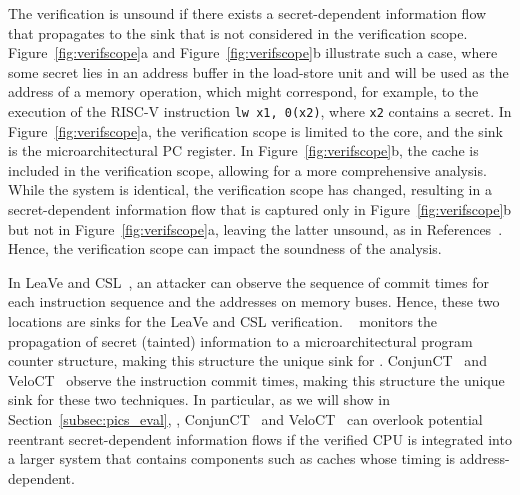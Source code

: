 The verification is unsound if there exists a secret-dependent information flow that propagates to the sink that is not considered in the verification scope.
Figure~\ref{fig:verifscope}a and Figure~\ref{fig:verifscope}b illustrate such a case, where some secret lies in an address buffer in the load-store unit and will be used as the address of a memory operation, which might correspond, for example, to the execution of the RISC-V instruction \texttt{lw x1, 0(x2)}, where \texttt{x2} contains a secret.
In Figure~\ref{fig:verifscope}a, the verification scope is limited to the core, and the sink is the microarchitectural PC register.
In Figure~\ref{fig:verifscope}b, the cache is included in the verification scope, allowing for a more comprehensive analysis.
While the system is identical, the verification scope has changed, resulting in a secret-dependent information flow that is captured only in Figure~\ref{fig:verifscope}b but not in Figure~\ref{fig:verifscope}a, leaving the latter unsound, as in References~\cite{ceesay2024mucfi,dinesh2024conjunct,dinesh2025h,tan2025contractshadowlogic}.
Hence, the verification scope can impact the soundness of the analysis.


In LeaVe and CSL~\cite{tan2025contractshadowlogic}, an attacker can observe the sequence of commit times for each instruction sequence and the addresses on memory buses.
Hence, these two locations are sinks for the LeaVe and CSL verification.
\ucfi~\cite{ceesay2024mucfi} monitors the propagation of secret (tainted) information to a microarchitectural program counter structure, making this structure the unique sink for \ucfi.
ConjunCT~\cite{dinesh2024conjunct} and VeloCT~\cite{dinesh2025h} observe the instruction commit times, making this structure the unique sink for these two techniques.
In particular, as we will show in Section~\ref{subsec:pics_eval}, \ucfi, ConjunCT~\cite{dinesh2024conjunct} and VeloCT~\cite{dinesh2025h} can overlook potential reentrant secret-dependent information flows if the verified CPU is integrated into a larger system that contains components such as caches whose timing is address-dependent.

